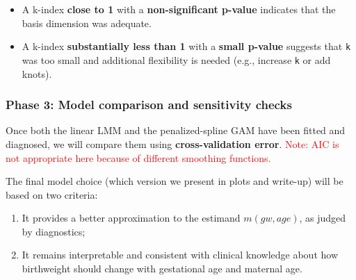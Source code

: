 \documentclass[
  letterpaper,
  DIV=11,
  numbers=noendperiod]{scrreprt}
\providecommand{\tightlist}{%
  \setlength{\itemsep}{0pt}\setlength{\parskip}{0pt}}\usepackage{longtable,booktabs,array}
\begin{document}
\begin{itemize}
\tightlist
\item
  A k-index \textbf{close to 1} with a \textbf{non-significant p-value}
  indicates that the basis dimension was adequate.
\item
  A k-index \textbf{substantially less than 1} with a \textbf{small
  p-value} suggests that \texttt{k} was too small and additional
  flexibility is needed (e.g., increase \texttt{k} or add knots).
\end{itemize}

\hypertarget{phase-3-model-comparison-and-sensitivity-checks}{%
\subsubsection*{Phase 3: Model comparison and sensitivity
checks}\label{phase-3-model-comparison-and-sensitivity-checks}}

Once both the linear LMM and the penalized-spline GAM have been fitted
and diagnosed, we will compare them using \textbf{cross-validation
error}.
\textcolor{red}{Note: AIC is not appropriate here because of different smoothing functions.}

The final model choice (which version we present in plots and write-up)
will be based on two criteria:

\begin{enumerate}
\def\labelenumi{\arabic{enumi}.}
\tightlist
\item
  It provides a better approximation to the estimand \(m(gw, age)\), as
  judged by diagnostics;\\
\item
  It remains interpretable and consistent with clinical knowledge about
  how birthweight should change with gestational age and maternal age.
\end{enumerate}
\end{document}
